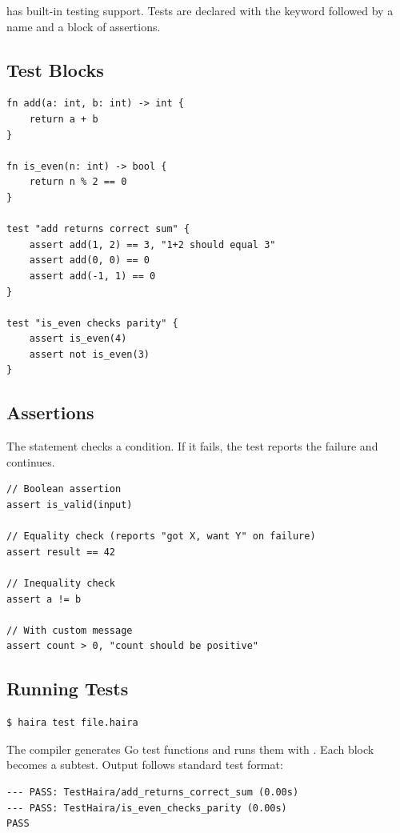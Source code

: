 \haira{} has built-in testing support. Tests are declared with the  keyword followed by a name and a block of assertions.

\subsection{Test Blocks}

\begin{lstlisting}
fn add(a: int, b: int) -> int {
    return a + b
}

fn is_even(n: int) -> bool {
    return n % 2 == 0
}

test "add returns correct sum" {
    assert add(1, 2) == 3, "1+2 should equal 3"
    assert add(0, 0) == 0
    assert add(-1, 1) == 0
}

test "is_even checks parity" {
    assert is_even(4)
    assert not is_even(3)
}
\end{lstlisting}

\subsection{Assertions}

The  statement checks a condition. If it fails, the test reports the failure and continues.

\begin{lstlisting}
// Boolean assertion
assert is_valid(input)

// Equality check (reports "got X, want Y" on failure)
assert result == 42

// Inequality check
assert a != b

// With custom message
assert count > 0, "count should be positive"
\end{lstlisting}

\subsection{Running Tests}

\begin{lstlisting}[language=bash,numbers=none]
$ haira test file.haira
\end{lstlisting}

The compiler generates Go test functions and runs them with . Each  block becomes a subtest. Output follows standard test format:

\begin{lstlisting}[language={},numbers=none]
--- PASS: TestHaira/add_returns_correct_sum (0.00s)
--- PASS: TestHaira/is_even_checks_parity (0.00s)
PASS
\end{lstlisting}
